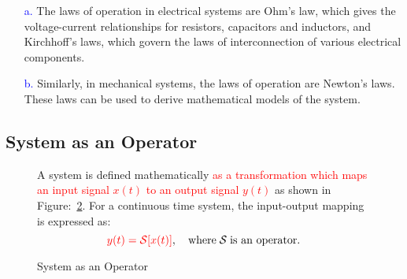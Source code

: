 \documentclass[../notes-main.tex]{subfiles}
\begin{document}
\begin{itemize}
    \item[\textcolor{blue}{a.}] The laws of operation in electrical systems are Ohm's law, which gives the voltage-current relationships for resistors, capacitors and inductors, and Kirchhoff's laws, which govern the laws of interconnection of various electrical components.
    \item[\textcolor{blue}{b.}] Similarly, in mechanical systems, the laws of operation are Newton's laws. These laws can be used to derive mathematical models of the system.
\end{itemize}

\subsection{System as an Operator}
\begin{figure}[H]
    \centering
    \begin{mdframed}
        \begin{center}
            A system is defined mathematically \textcolor{red}{as a transformation which maps an input signal \(x(t)\) to an output signal \(y(t)\)} as shown in Figure:~\ref{fig:system-operator-def-2}. For a continuous time system, the input-output mapping is expressed as:
            \begin{equation}
                \textcolor{red}{y(t) = \mathcal{S}[x(t)]}, \quad \text{where} \; \mathcal{S} \; \text{is an operator.}
                \label{eq:system-operator-def-1}
            \end{equation}
        \end{center}
    \end{mdframed}\label{fig:system-operator-def-1}
    \vspace{-1em}
\end{figure}
\vspace{-1em}
\begin{figure}[H]
    \centering
    \begin{mdframed}
        \begin{center}
        \end{center}
    \end{mdframed}
    \vspace{-1em}\caption{System as an Operator}\label{fig:system-operator-def-2}
\end{figure}
\end{document}
